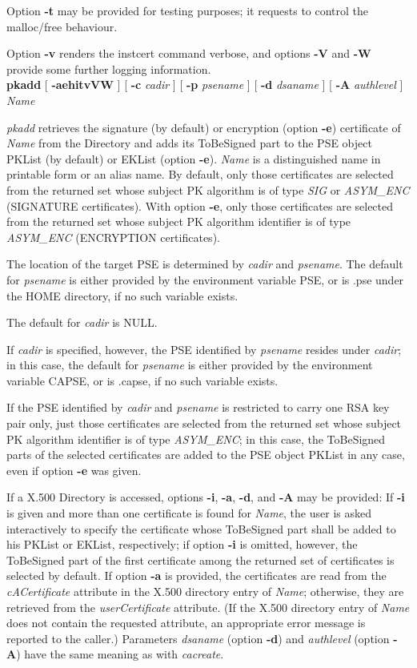 Option {\bf -t} may be provided for testing purposes; it requests to control the malloc/free behaviour.

Option {\bf -v} renders the instcert command verbose, and options {\bf -V} and {\bf -W} 
provide some further logging
information.
\\ [1em] 
{\bf pkadd} [ {\bf -aehitvVW} ] [ {\bf -c} {\em cadir} ] [ {\bf -p} {\em psename} ] [ {\bf -d} {\em dsaname} ] [ {\bf -A} {\em authlevel} ] {\em Name}

{\em pkadd} retrieves the signature (by default) or encryption (option {\bf -e}) certificate 
of {\em Name} from the Directory
and adds its ToBeSigned part to the PSE object PKList (by default) or EKList 
(option {\bf -e}).
{\em Name} is a distinguished name in printable form or an alias name.
By default, only those certificates are selected from the returned set whose subject PK algorithm 
is of type {\em SIG} or {\em ASYM\_ENC} (SIGNATURE certificates).
With option {\bf -e}, only those certificates are selected from the returned set whose
subject PK algorithm identifier is of type {\em ASYM\_ENC} (ENCRYPTION certificates).

The location of the target PSE is determined by {\em cadir} and {\em psename}. The default for {\em 
psename} is either provided by the environment variable PSE, or is .pse under the HOME directory, if no such
variable exists.
 
The default for {\em cadir} is NULL. 

If {\em cadir} is specified,
however, the PSE identified by {\em psename} resides under {\em cadir}; in this case, the default
for {\em psename} is either provided by the environment variable CAPSE, or is .capse, if no such variable
exists.

If the PSE identified by {\em cadir} and {\em psename} is restricted to carry 
one RSA key pair only, just those certificates are selected from the returned set whose
subject PK algorithm identifier is of type {\em ASYM\_ENC}; in this case, the
ToBeSigned parts of the selected
certificates are added to the PSE object PKList in any case, even if option {\bf -e} was given. 
 
If a X.500 Directory is accessed, options {\bf -i}, {\bf -a}, {\bf -d}, and {\bf -A} may
be provided:
If {\bf -i} is given and more than one certificate is found for {\em Name}, the user is asked
interactively to specify the certificate whose ToBeSigned part shall be added to his
PKList or EKList, respectively; if option {\bf -i} is omitted, however, the ToBeSigned part
of the first certificate among the returned set of certificates is selected by default.
If option {\bf -a} is provided, the certificates are read from the {\em cACertificate} attribute in
the X.500 directory entry of {\em Name}; otherwise, they are retrieved from the {\em userCertificate} attribute. (If the X.500 directory entry of {\em Name} does not contain the requested attribute,
an appropriate error message is reported to the caller.)
Parameters {\em dsaname} (option {\bf -d}) and {\em authlevel} (option {\bf -A}) have the same meaning as with {\em cacreate}.
 
